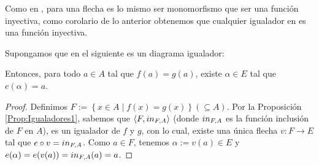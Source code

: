 Como en , para una flecha es lo mismo ser monomorfismo que ser una función inyectiva, como corolario de lo anterior obtenemos que cualquier igualador en  es una función inyectiva.
\begin{Prop}\label{Prop:Igualadores2}
   Supongamos que en  el siguiente es un diagrama igualador:
   
   Entonces, para todo $a\in A$ tal que $f(a)=g(a)$, existe $\alpha\in E$ tal que $e(\alpha)=a$.
\end{Prop}
\begin{proof}
  Definimos $F:=\left\lbrace x\in A\mid f(x)=g(x)\right\rbrace (\subseteq A)$. Por la Proposición \ref{Prop:Igualadores1}, sabemos que $\langle F,\normalfont{in}_{F,A}\rangle$ (donde $\normalfont{in}_{F,A}$ es la función inclusión de $F$ en $A$), es un igualador de $f$ y $g$, con lo cual, existe una única flecha $v:F\to E$ tal que $e\circ v=\normalfont{in}_{F,A}$. Como $a\in F$, tenemos $\alpha:=v(a)\in E$ y $e(\alpha)=e(v(a))=\normalfont{in}_{F,A}(a)=a$. 

\end{proof}
